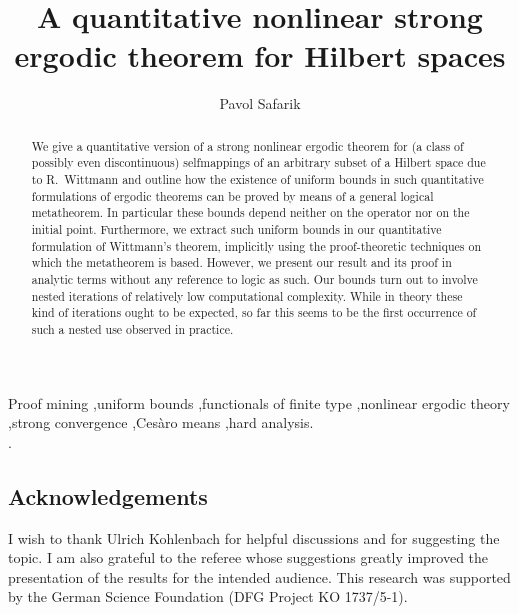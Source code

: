 \documentclass[1p]{elsarticle}
\theoremstyle{definition}
\begin{document}


\title{A quantitative nonlinear strong ergodic theorem for Hilbert spaces}
\author{Pavol Safarik}
\address{Department of Mathematics, Technische Universit\"at Darmstadt, Schlossgartenstra{\ss}e 7, 64289 Darmstadt, Germany}

\date{}

\begin{abstract}
We give a quantitative version of a strong nonlinear ergodic theorem for (a class of possibly even discontinuous) 
selfmappings of an arbitrary subset of a Hilbert space due to R.~Wittmann and 
outline how the existence of uniform bounds in such quantitative formulations of ergodic theorems
can be proved by means of a general logical metatheorem.
In particular these bounds depend neither on the operator nor on the initial point.
Furthermore, we extract such
uniform bounds in our quantitative formulation of Wittmann's theorem, implicitly using the 
proof-theoretic techniques on which the metatheorem is based. However, we present our result
and its proof in analytic terms without any reference to logic as such. Our bounds turn out to involve
nested iterations of relatively low computational complexity. While in theory these kind
of iterations ought to be expected, so far this seems to be the first occurrence
of such a nested use observed in practice. %
\end{abstract}

\begin{keyword}
Proof mining \sep uniform bounds \sep functionals of finite type \sep nonlinear ergodic theory \sep strong convergence \sep Ces{\`a}ro means \sep hard analysis.\\
.
\end{keyword}


\maketitle



%


%

%







\subsection*{Acknowledgements}
I wish to thank Ulrich Kohlenbach for helpful discussions and for suggesting the topic.
I am also grateful to the referee whose suggestions greatly improved the presentation of the results for the intended audience.
This research was supported by the German Science Foundation (DFG Project KO 1737/5-1). 


\end{document}
